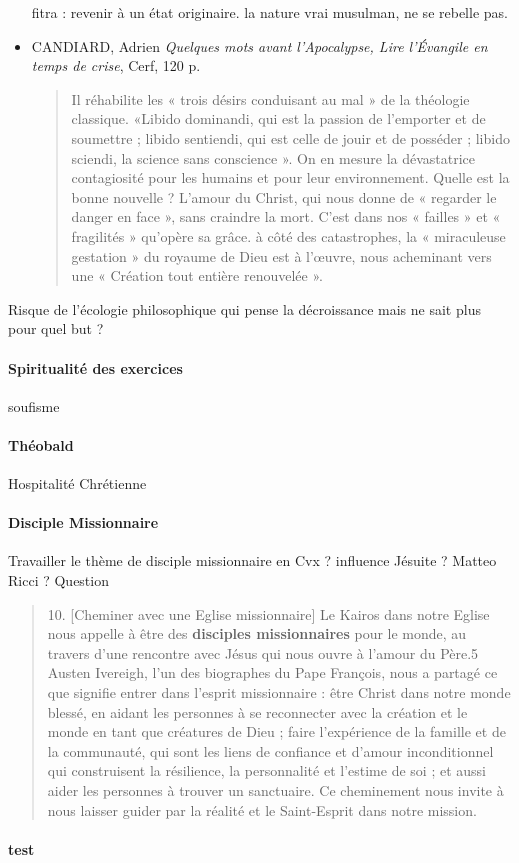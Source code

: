 \begin{itemize}
    fitra : revenir à un état originaire. la nature vrai musulman, ne se rebelle pas.
    \item CANDIARD, Adrien \textit{Quelques mots avant l’Apocalypse, Lire l’Évangile en temps de crise}, Cerf, 120 p.
    \begin{quote}
        Il réhabilite les « trois désirs conduisant au mal » de la théologie classique. «Libido dominandi, qui est la passion de l’emporter et de soumettre ; libido sentiendi, qui est celle de jouir et de posséder ; libido sciendi, la science sans conscience ». On en mesure la dévastatrice contagiosité pour les humains et pour leur environnement. Quelle est la bonne nouvelle ? L’amour du Christ, qui nous donne de « regarder le danger en face », sans craindre la mort. C’est dans nos « failles » et « fragilités » qu’opère sa grâce. à côté des catastrophes, la « miraculeuse gestation » du royaume de Dieu est à l’œuvre, nous acheminant vers une « Création tout entière renouvelée ». 
    \end{quote}
    
\end{itemize}
Risque de l'écologie philosophique qui pense la décroissance mais ne sait plus pour quel but ? 


\paragraph{Spiritualité des exercices} soufisme

\paragraph{Théobald} Hospitalité Chrétienne

\paragraph{Disciple Missionnaire} Travailler le thème de disciple
missionnaire en Cvx ? influence
Jésuite ? Matteo Ricci ? Question

\begin{quote}
    10. [Cheminer avec une Eglise missionnaire] Le Kairos dans notre Eglise nous appelle à être des \textbf{disciples missionnaires} pour le monde, au travers d’une rencontre avec Jésus qui nous ouvre à l’amour du Père.5 Austen Ivereigh, l’un des biographes du Pape François, nous a partagé ce que signifie entrer dans l’esprit missionnaire : être Christ dans notre monde blessé, en aidant les personnes à se reconnecter avec la création et le monde en tant que créatures de Dieu ; faire l’expérience de la famille et de la communauté, qui sont les liens de confiance et d’amour inconditionnel qui construisent la résilience, la personnalité et l’estime de soi ; et aussi aider les personnes à trouver un sanctuaire. Ce cheminement nous invite à nous laisser guider par la réalité et le Saint-Esprit dans notre mission. 
\end{quote}


\paragraph{test} \cite{Gardet:IntroductionTheoMusulmane}
